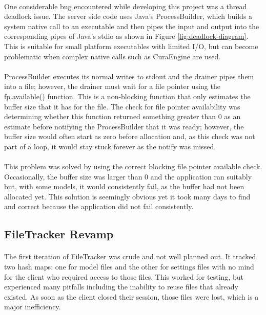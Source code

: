 \paragraph{}
One considerable bug encountered while developing this project was a thread deadlock issue. 
The server side code uses Java's ProcessBuilder, which builds a system native call to an executable and then pipes the input and output into the corresponding pipes of Java's stdio as shown in Figure \ref{fig:deadlock-diagram}.
This is suitable for small platform executables with limited I/O, but can become problematic when complex native calls such as CuraEngine are used.

\paragraph{}
ProcessBuilder executes its normal writes to stdout and the drainer pipes them into a file; however, the drainer must wait for a file pointer using the fp.available() function. 
This is a non-blocking function that only estimates the buffer size that it has for the file. 
The check for file pointer availability was determining whether this function returned something greater than 0 as an estimate before notifying the ProcessBuilder that it was ready;
however, the buffer size would often start as zero before allocation and, as this check was not part of a loop, it would stay stuck forever as the notify was missed.

\paragraph{}
This problem was solved by using the correct blocking file pointer available check. 
Occasionally, the buffer size was larger than 0 and the application ran suitably but, with some models, it would consistently fail, as the buffer had not been allocated yet.
This solution is seemingly obvious yet it took many days to find and correct because the application did not fail consistently.

\subsection{FileTracker Revamp}
\paragraph{}
The first iteration of FileTracker was crude and not well planned out. 
It tracked two hash maps: one for model files and the other for settings files with no mind for the client who required access to those files. 
This worked for testing, but experienced many pitfalls including the inability to reuse files that already existed. 
As soon as the client closed their session, those files were lost, which is a major inefficiency.

